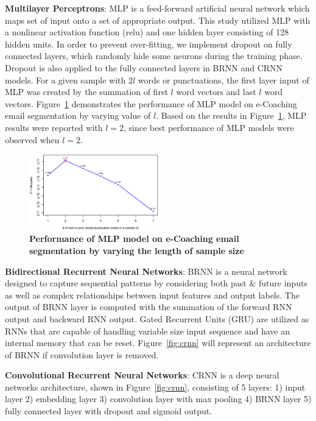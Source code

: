 \documentclass{amia}
\begin{document}
\textbf{Multilayer Perceptrons}: MLP is a feed-forward artificial neural network which maps set of input onto a set of appropriate output.\cite{rumelhart1986learning} This study utilized MLP with a nonlinear activation function (relu) and one hidden layer consisting of 128 hidden units. In order to prevent over-fitting, we implement dropout on fully connected layers, which randomly hide some neurons during the training phase. \cite{srivastava2014dropout} Dropout is also applied to the fully connected layers in BRNN and CRNN models. For a given sample with $2l$ words or punctuations, the first layer input of MLP was created by the summation of first $l$ word vectors and last $l$ word vectors. Figure~\ref{fig:length-mlp} demonstrates the performance of MLP model on e-Coaching email segmentation by varying value of $l$. Based on the results in Figure~\ref{fig:length-mlp}, MLP results were reported with $l = 2$, since best performance of MLP models were observed when $l = 2$.  

\begin{figure}[!htb]
    \centering
    \includegraphics[width=0.5\textwidth]{figures/length-mlp.eps}
    \caption{\textbf{Performance of MLP model on e-Coaching email segmentation by varying the length of sample size}}
    \label{fig:length-mlp}
\end{figure}

\textbf{Bidirectional Recurrent Neural Networks}: BRNN is a neural network designed to capture sequential patterns by considering both past \& future inputs as well as complex relationships between input features and output labels.\cite{schuster1997bidirectional} The output of BRNN layer is computed with the summation of the forward RNN output and backward RNN output. Gated Recurrent Units (GRU)\cite{chung2014empirical} are utilized as RNNs that are capable of handling variable size input sequence and have an internal memory that can be reset. Figure~\ref{fig:crnn} will represent an architecture of BRNN if convolution layer is removed.  

\textbf{Convolutional Recurrent Neural Networks}: CRNN is a deep neural networks architecture,\cite{treviso2017sentence} shown in Figure~\ref{fig:crnn}, consisting of 5 layers: 1) input layer 2) embedding layer 3) convolution layer with max pooling 4) BRNN layer 5) fully connected layer with dropout and sigmoid output. 
\end{document}
